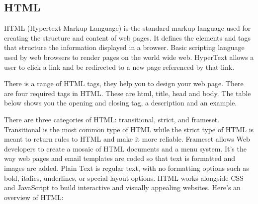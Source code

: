 \documentclass[12 pt, oneside]{book}
\begin{document}
\subsection{HTML}
HTML (Hypertext Markup Language) is the standard markup language used for creating the structure and content of web pages. It defines the elements and tags that structure the information displayed in a browser. Basic scripting language used by web browsers to render pages on the world wide web. HyperText allows a user to click a link and be redirected to a new page referenced by that link.

There is a range of HTML tags, they help you to design your web page. There are four required tags in HTML. These are html, title, head and body. The table below shows you the opening and closing tag, a description and an example.

There are three categories of HTML: transitional, strict, and frameset. Transitional is the most common type of HTML while the strict type of HTML is meant to return rules to HTML and make it more reliable. Frameset allows Web developers to create a mosaic of HTML documents and a menu system. It's the way web pages and email templates are coded so that text is formatted and images are added. Plain Text is regular text, with no formatting options such as bold, italics, underlines, or special layout options. HTML works alongside CSS and JavaScript to build interactive and visually appealing websites. Here's an overview of HTML:
\end{document}
